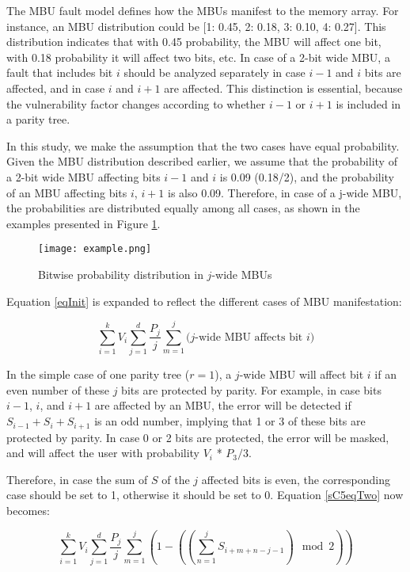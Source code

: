 \documentclass[12pt]{yalephd}
\begin{document}
The MBU fault model defines how the MBUs manifest to the memory array. For instance, an MBU distribution could be [1: 0.45, 2: 0.18, 3: 0.10, 4: 0.27]. This distribution indicates that with 0.45 probability, the MBU will affect one bit, with 0.18 probability it will affect two bits, etc. In case of a 2-bit wide MBU, a fault that includes bit $i$ should be analyzed separately in case $i-1$ and $i$ bits are affected, and in case $i$ and $i+1$ are affected. This distinction is essential, because the vulnerability factor changes according to whether $i-1$ or $i+1$ is included in a parity tree.

In this study, we make the assumption that the two cases have equal probability. Given the MBU distribution described earlier, we assume that the probability of a 2-bit wide MBU affecting bits $i-1$ and $i$ is 0.09 (0.18/2), and the probability of an MBU affecting bits $i$, $i+1$ is also 0.09. Therefore, in case of a j-wide MBU, the probabilities are distributed equally among all cases, as shown in the examples presented in Figure \ref{sC5fMBUexample}.

\begin{figure}[!ht]%
\centering
\texttt{[image: example.png]}%
\caption{Bitwise probability distribution in $j$-wide MBUs}%
\label{sC5fMBUexample}%
\end{figure}

Equation \ref{eqInit} is expanded to reflect the different cases of MBU manifestation:

\begin{equation}\label{sC5eqTwo}
\sum_{i=1}^{k} V_i \sum_{j=1}^{d} \frac{P_j}{j} \sum_{m=1}^{j} \text{($j$-wide MBU affects bit $i$)}
\end{equation}

In the simple case of one parity tree ($r=1$), a $j$-wide MBU will affect bit $i$ if an even number of these $j$ bits are protected by parity. For example, in case bits $i-1$, $i$, and $i+1$ are affected by an MBU, the error will be detected if $S_{i-1} + S_{i} + S_{i+1}$ is an odd number, implying that 1 or 3 of these bits are protected by parity. In case 0 or 2 bits are protected, the error will be masked, and will affect the user with probability $V_i$ * $P_3/3$.

Therefore, in case the sum of $S$ of the $j$ affected bits is even, the corresponding case should be set to 1, otherwise it should be set to 0. Equation \ref{sC5eqTwo} now becomes:

\begin{equation}\label{sC5eqThree}
\sum_{i=1}^{k} V_i \sum_{j=1}^{d} \frac{P_j}{j} \sum_{m=1}^{j} (1 - ((\sum_{n=1}^{j} S_{i+m+n-j-1}) \mod 2))
\end{equation}
\end{document}
